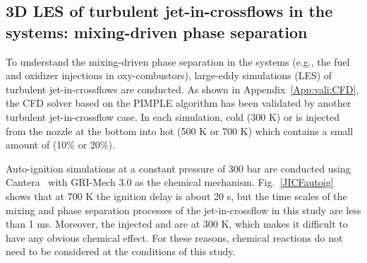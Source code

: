 \subsection{3D LES of turbulent jet-in-crossflows in the  systems: mixing-driven phase separation}
\label{sec:results:JICF}
To understand the mixing-driven phase separation in the  systems (e.g., the fuel and oxidizer injections in  oxy-combustors), large-eddy simulations (LES) of turbulent jet-in-crossflows are conducted. As shown in Appendix~\ref{App:vali:CFD}, the CFD solver based on the PIMPLE algorithm has been validated by another turbulent jet-in-crossflow case. %
In each simulation, cold (300 K)  or  is injected from the nozzle at the bottom into hot (500 K or 700 K)  which contains a small amount of  (10\% or 20\%). %

Auto-ignition simulations at a constant pressure of 300 bar are conducted using Cantera~\cite{goodwin2009cantera} with GRI-Mech 3.0 \cite{smith1999gri} as the chemical mechanism. Fig.~\ref{JICFautoig} shows that at 700 K the ignition delay is about 20 s, but the time scales of the mixing and phase separation processes of the jet-in-crossflow in this study are less than 1 ms. Moreover, the injected  and  are at 300 K, which makes it difficult to have any obvious chemical effect. For these reasons, chemical reactions do not need to be considered at the conditions of this study.

